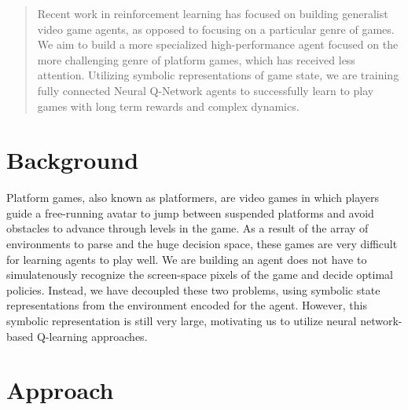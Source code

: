 \documentclass{article}
\begin{document}
 


\begin{abstract} 
Recent work in reinforcement learning has focused on building generalist video game agents, as opposed to focusing on a particular genre of games. We aim to build a more specialized high-performance agent focused on the more challenging genre of platform games, which has received less attention. Utilizing symbolic representations of game state, we are training fully connected Neural Q-Network agents to successfully learn to play games with long term rewards and complex dynamics.
\end{abstract} 



\section{Background}
Platform games, also known as platformers, are video games in which players guide a free-running avatar to jump between suspended platforms and avoid obstacles to advance through levels in the game. As a result of the array of environments to parse and the huge decision space, these games are very difficult for learning agents to play well. We are building an agent does not have to simulatenously recognize the screen-space pixels of the game and decide optimal policies. Instead, we have decoupled these two problems, using symbolic state representations from the environment encoded for the agent. However, this symbolic representation is still very large, motivating us to utilize neural network-based Q-learning approaches. 

\section{Approach}
\end{document}
